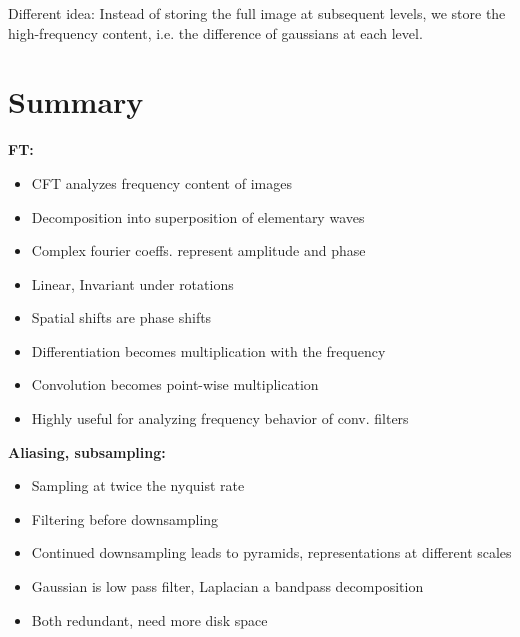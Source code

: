 Different idea: Instead of storing the full image at subsequent levels, we store the high-frequency content, i.e. the difference of gaussians at each level.

\section{Summary}

\textbf{FT:}

\begin{itemize}
    \item CFT analyzes frequency content of images
    \item Decomposition into superposition of elementary waves
    \item Complex fourier coeffs. represent amplitude and phase
    \item Linear, Invariant under rotations
    \item Spatial shifts are phase shifts
    \item Differentiation becomes multiplication with the frequency
    \item Convolution becomes point-wise multiplication
    \item Highly useful for analyzing frequency behavior of conv. filters
\end{itemize}

\textbf{Aliasing, subsampling:}

\begin{itemize}
    \item Sampling at twice the nyquist rate
    \item Filtering before downsampling
    \item Continued downsampling leads to pyramids, representations at different scales
    \item Gaussian is low pass filter, Laplacian a bandpass decomposition
    \item Both redundant, need more disk space
\end{itemize}



























